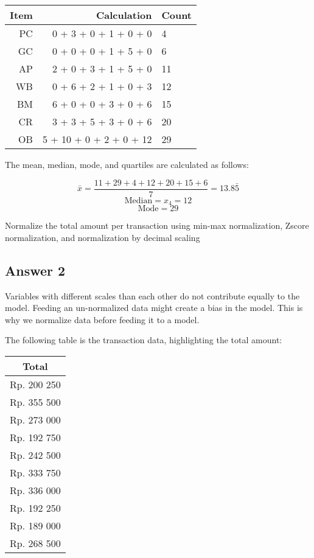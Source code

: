 \documentclass[
  11pt, %
]{assignment}
\begin{document}
\medskip

\begin{center}
	\begin{tabular}{r | r | l}
		Item & Calculation             & Count \\
		\toprule
		PC   & 0 + 3 + 0 + 1 + 0 + 0   & 4     \\
		GC   & 0 + 0 + 0 + 1 + 5 + 0   & 6     \\
		AP   & 2 + 0 + 3 + 1 + 5 + 0   & 11    \\
		WB   & 0 + 6 + 2 + 1 + 0 + 3   & 12    \\
		BM   & 6 + 0 + 0 + 3 + 0 + 6   & 15    \\
		CR   & 3 + 3 + 5 + 3 + 0 + 6   & 20    \\
		OB   & 5 + 10 + 0 + 2 + 0 + 12 & 29    \\
		\bottomrule
	\end{tabular}
\end{center}

\medskip

The mean, median, mode, and quartiles are calculated as follows:

\[ \bar{x} = \frac{11 + 29 + 4 + 12 + 20 + 15 + 6}{7} = 13.8\bar{5} \]
\[ \text{Median} = x_4 = 12 \]
\[ \text{Mode} = 29 \]

\begin{problem}
Normalize the total amount per transaction using min-max normalization, Zscore normalization, and normalization by decimal scaling
\end{problem}

\subsection*{Answer 2}

Variables with different scales than each other do not contribute equally to the model. Feeding an un-normalized data might create a bias in the model. This is why we normalize data before feeding it to a model.

The following table is the transaction data, highlighting the total amount:

\begin{center}
	\begin{tabular}{c}
		Total       \\
		\toprule
		Rp. 200 250 \\
		Rp. 355 500 \\
		Rp. 273 000 \\
		Rp. 192 750 \\
		Rp. 242 500 \\
		Rp. 333 750 \\
		Rp. 336 000 \\
		Rp. 192 250 \\
		Rp. 189 000 \\
		Rp. 268 500 \\
	\end{tabular}
\end{center}
\end{document}
